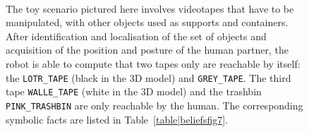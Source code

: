 \documentclass[preprint,3p,times]{elsarticle}
\newcommand{\concept}[1]{{\small \texttt{#1}}}
\begin{document}
\begin{figure}[ht!]
   \begin{center}
%
       \\ %
%
   \end{center}

   \caption{The toy scenario pictured here involves videotapes that have to be
       manipulated, with other objects used as supports and containers.  After
       identification and localisation of the set of objects and acquisition of
       the position and posture of the human partner, the robot is able to
       compute that two tapes only are reachable by itself: the
       \concept{LOTR\_TAPE} (black in the 3D model) and \concept{GREY\_TAPE}.
       The third tape \concept{WALLE\_TAPE} (white in the 3D model) and the
   trashbin \concept{PINK\_TRASHBIN} are only reachable by the human. The
   corresponding symbolic facts are listed in Table~\ref{table|beliefsfig7}.  }%
 
 \label{fig:sparkSubfigures}

\end{figure}
\end{document}
